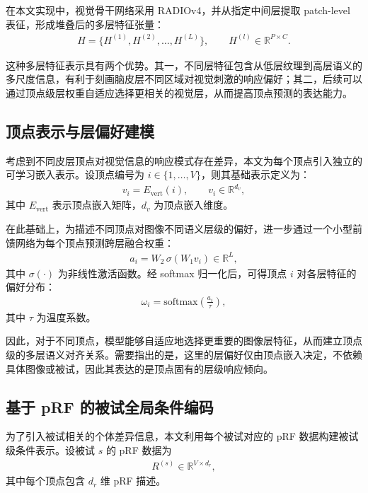 在本文实现中，视觉骨干网络采用 RADIOv4，并从指定中间层提取 patch-level 表征，形成堆叠后的多层特征张量：
\begin{align}
  H = \{H^{(1)}, H^{(2)}, \dots, H^{(L)}\}, \qquad H^{(l)} \in \mathbb{R}^{P \times C}.
\end{align}

这种多层特征表示具有两个优势。其一，不同层特征包含从低层纹理到高层语义的多尺度信息，有利于刻画脑皮层不同区域对视觉刺激的响应偏好；其二，后续可以通过顶点级层权重自适应选择更相关的视觉层，从而提高顶点预测的表达能力。

\subsection{顶点表示与层偏好建模}

考虑到不同皮层顶点对视觉信息的响应模式存在差异，本文为每个顶点引入独立的可学习嵌入表示。设顶点编号为 $i \in \{1, \dots, V\}$，则其基础表示定义为：
\begin{align}
  v_i = E_{\mathrm{vert}}(i), \qquad v_i \in \mathbb{R}^{d_v},
\end{align}
其中 $E_{\mathrm{vert}}$ 表示顶点嵌入矩阵，$d_v$ 为顶点嵌入维度。

在此基础上，为描述不同顶点对图像不同语义层级的偏好，进一步通过一个小型前馈网络为每个顶点预测跨层融合权重：
\begin{align}
  a_i = W_2\,\sigma(W_1 v_i) \in \mathbb{R}^{L},
\end{align}
其中 $\sigma(\cdot)$ 为非线性激活函数。经 softmax 归一化后，可得顶点 $i$ 对各层特征的偏好分布：
\begin{align}
  \omega_i = \mathrm{softmax}\!\left(\frac{a_i}{\tau}\right),
\end{align}
其中 $\tau$ 为温度系数。

因此，对于不同顶点，模型能够自适应地选择更重要的图像层特征，从而建立顶点级的多层语义对齐关系。需要指出的是，这里的层偏好仅由顶点嵌入决定，不依赖具体图像或被试，因此其表达的是顶点固有的层级响应倾向。

\subsection{基于 pRF 的被试全局条件编码}

为了引入被试相关的个体差异信息，本文利用每个被试对应的 pRF 数据构建被试级条件表示。设被试 $s$ 的 pRF 数据为
\begin{align}
  R^{(s)} \in \mathbb{R}^{V \times d_r},
\end{align}
其中每个顶点包含 $d_r$ 维 pRF 描述。

